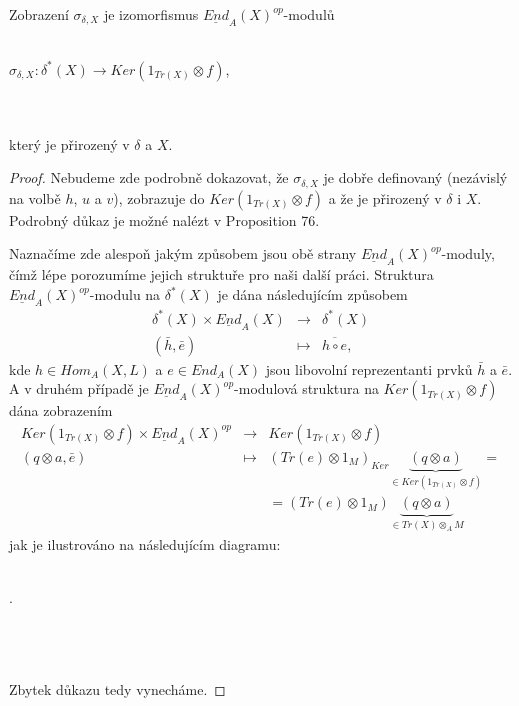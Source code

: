       \begin{thm}\label{thm-sigma-delta-x}
        Zobrazení $\sigma_{\delta,X}$ je 
        izomorfismus $\underline{End}_A(X)^{op}$-modulů \\\\
        \centerline{$\sigma_{\delta,X}:\delta^*(X)\rightarrow Ker(1_{Tr(X)}\otimes f)$,} \\\\
        který je přirozený v $\delta$ a $X$.
      \end{thm}
      \begin{proof}
        Nebudeme zde podrobně dokazovat, že $\sigma_{\delta,X}$ je dobře 
        definovaný (nezávislý na volbě $h$, $u$ a $v$),
         zobrazuje do $Ker(1_{Tr(X)}\otimes f)$ a že je přirozený v $\delta$ i $X$. 
         Podrobný důkaz je možné nalézt v \cite{3} Proposition 76.
        
        Naznačíme zde alespoň jakým způsobem jsou obě strany 
        $\underline{End}_A(X)^{op}$-moduly, čímž lépe porozumíme jejich 
        struktuře pro naši další práci. Struktura $\underline{End}_A(X)^{op}$-modulu na $\delta^*(X)$ 
         je dána následujícím způsobem
         \begin{eqnarray}
           \delta^*(X)\times \underline{End}_A(X) &\to& \delta^*(X) \nonumber \\
           (\bar h,\bar e) &\mapsto& \overline{h\circ e}, \nonumber
         \end{eqnarray}
         kde $h\in Hom_A(X,L)$  a $e\in End_A(X)$ jsou libovolní reprezentanti 
         prvků $\bar h$ a $\bar e$.
         A v druhém případě je
         $\underline{End}_A(X)^{op}$-modulová struktura na $Ker(1_{Tr(X)}\otimes f)$ 
         dána zobrazením
         \begin{eqnarray}
           Ker(1_{Tr(X)}\otimes f) \times \underline{End}_A(X)^{op} &\to& Ker(1_{Tr(X)}\otimes f) 
           \nonumber \\
           (q\otimes a, \bar e) &\mapsto& 
           (Tr(e)\otimes 1_M)_{Ker}\underbrace{(q\otimes a)}_{\in Ker(1_{Tr(X)}\otimes 
           f)}= \nonumber \\
            && =(Tr(e)\otimes 1_M)\underbrace{(q\otimes a)}_{\in Tr(X)\otimes_A M}
           \nonumber
         \end{eqnarray}
         jak je ilustrováno na následujícím diagramu: \\\\
         \centerline{.}\\\\\\
        Zbytek důkazu  tedy vynecháme.        
      \end{proof}
